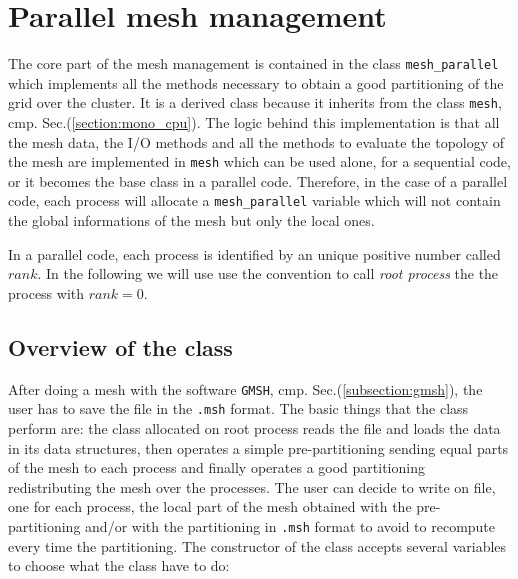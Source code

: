 \section{Parallel mesh management}\label{section:multi_CPUs}
The core part of the mesh management is contained in the class \verb|mesh_parallel| which implements all the methods necessary to obtain a good partitioning of the grid over the cluster. It is a derived class because it inherits from the class \verb|mesh|, cmp. Sec.(\ref{section:mono_cpu}). The logic behind this implementation is that all the mesh data, the I/O methods and all the methods to evaluate the topology of the mesh are implemented in \verb|mesh| which can be used alone, for a sequential code, or it becomes the base class in a parallel code. Therefore, in the case of a parallel code, each process will allocate a \verb|mesh_parallel| variable which will not contain the global informations of the mesh but only the local ones.
\medskip

In a parallel code, each process is identified by an unique positive number called $rank$. In the following we will use use the convention to call \textit{root process} the the process with $rank=0$.

\subsection{Overview of the class}\label{subsection:multi_CPU_overview}
After doing a mesh with the software \verb|GMSH|, cmp. Sec.(\ref{subsection:gmsh}), the user has to save the file in the \verb|.msh| format. The basic things that the class perform are: the class allocated on root process reads the file and loads the data in its data structures, then operates a simple pre-partitioning sending equal parts of the mesh to each process and finally operates a good partitioning redistributing the mesh over the processes. The user can decide to write on file, one for each process, the local part of the mesh obtained with the pre-partitioning and/or with the partitioning in \verb|.msh| format to avoid to recompute every time the partitioning. The constructor of the class accepts several variables to choose what the class have to do:


